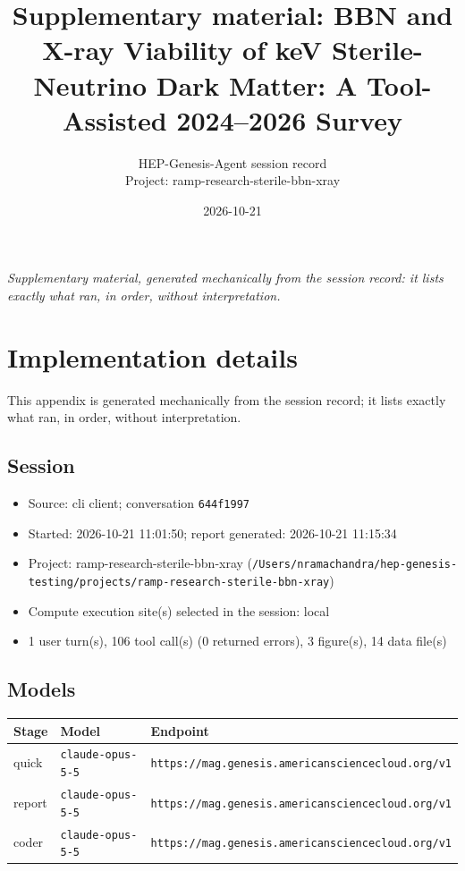 \documentclass[11pt,a4paper]{article}
\title{Supplementary material: BBN and X-ray Viability of keV Sterile-Neutrino Dark Matter: A Tool-Assisted 2024--2026 Survey}
\author{HEP-Genesis-Agent session record \\ \small Project: ramp-research-sterile-bbn-xray}
\date{2026-10-21}
\begin{document}
\maketitle
\noindent\textit{\small Supplementary material, generated mechanically from the session record: it lists exactly what ran, in order, without interpretation.}
\vspace{1em}



\appendix
\section{Implementation details}
\label{app:impl}
This appendix is generated mechanically from the session record; it lists exactly what ran, in order, without interpretation.
\subsection{Session}
\begin{itemize}
  \item Source: cli client; conversation \texttt{644f1997}
  \item Started: 2026-10-21 11:01:50; report generated: 2026-10-21 11:15:34
  \item Project: ramp-research-sterile-bbn-xray (\texttt{/\allowbreak{}Users/\allowbreak{}nramachandra/\allowbreak{}hep-genesis-testing/\allowbreak{}projects/\allowbreak{}ramp-research-sterile-bbn-xray})
  \item Compute execution site(s) selected in the session: local
  \item 1 user turn(s), 106 tool call(s) (0 returned errors), 3 figure(s), 14 data file(s)
\end{itemize}
\subsection{Models}
\begin{longtable}{@{}p{}p{}p{}@{}}
\toprule Stage & Model & Endpoint \\ \midrule \endhead
quick & \texttt{claude-opus-5-5} & \texttt{https:\allowbreak{}/\allowbreak{}/\allowbreak{}mag.genesis.americansciencecloud.org/\allowbreak{}v1} \\
report & \texttt{claude-opus-5-5} & \texttt{https:\allowbreak{}/\allowbreak{}/\allowbreak{}mag.genesis.americansciencecloud.org/\allowbreak{}v1} \\
coder & \texttt{claude-opus-5-5} & \texttt{https:\allowbreak{}/\allowbreak{}/\allowbreak{}mag.genesis.americansciencecloud.org/\allowbreak{}v1} \\
\bottomrule\end{longtable}
\end{document}
